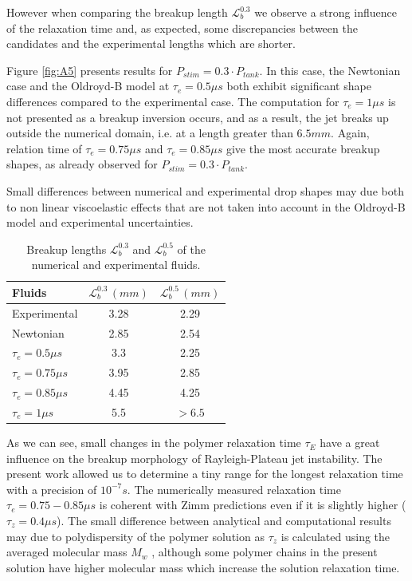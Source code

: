 \documentclass[twocolumn,10pt]{asme2ej}
\begin{document}
However when comparing the breakup length $\mathcal{L}^{0.3}_b$ we observe a strong influence of the relaxation time and, as expected, some discrepancies between the candidates and the experimental lengths which are shorter.

Figure \ref{fig:A5} presents results for $P_{stim}=0.3\cdot P_{tank}$. In this case, the Newtonian case and the Oldroyd-B model at  $\tau_e = 0.5 \mu s$ both exhibit significant shape differences compared to the experimental case. The computation for  $\tau_e = 1 \mu s$ is not presented as a breakup inversion occurs, and as a result, the jet breaks up outside the numerical domain, i.e. at a length greater than $6.5mm$.
Again, relation time of  $\tau_e = 0.75 \mu s$ and  $\tau_e = 0.85 \mu s$ give the most accurate breakup shapes, as already observed for $P_{stim}=0.3\cdot P_{tank}$.


Small differences between numerical and experimental drop shapes may due both to non linear viscoelastic effects that are not taken into account in the Oldroyd-B model and experimental uncertainties.

\begin{table}[H]
    \begin{center}
        \begin{tabular}{l|cc}
            Fluids & $\mathcal{L}^{0.3}_b\,(mm)$ &$\mathcal{L}^{0.5}_b\,(mm)$\\
            \hline
            Experimental  & 3.28  &2.29 \\
            Newtonian & 2.85 & 2.54\\ 
            $\tau_e = 0.5\mu s$ & 3.3 & 2.25\\ 
            $\tau_e = 0.75\mu s$ & 3.95 & 2.85\\ 
            $\tau_e = 0.85\mu s$ & 4.45 & 4.25\\ 
            $\tau_e = 1\mu s$ & 5.5 & $> 6.5$\\ 
            \hline
        \end{tabular}
    \end{center}
    \label{tab:lbInk}
    \caption{Breakup lengths $\mathcal{L}^{0.3}_b$ and $\mathcal{L}^{0.5}_b$ of the numerical and experimental fluids.}
\end{table}


As we can see, small changes in the polymer relaxation time $\tau_E$ have a great influence on the breakup morphology of Rayleigh-Plateau jet instability. The present work allowed us to determine a tiny range for the longest relaxation time with a precision of $10^{-7} s$. The numerically measured relaxation time $\tau_e = 0.75-0.85 \mu s$ is coherent with Zimm predictions even if it is slightly higher ($\tau_z = 0.4 \mu s$).  The small difference between analytical and computational results may due to polydispersity of the polymer solution as $\tau_z$ is calculated using the averaged molecular mass $M_w$ , although some
polymer chains in the present solution have higher molecular mass which increase the solution relaxation time.
\end{document}

